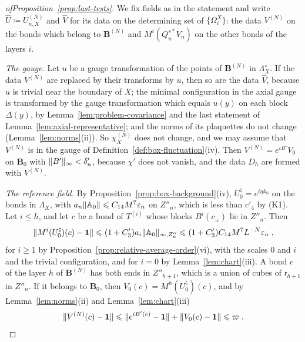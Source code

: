 \documentclass[11pt]{preprint}
\newcommand{\id}{\mathbf 1}
\DeclarePairedDelimiter{\norm}{\lVert}{\rVert}
\numberwithin{equation}{section}
\begin{document}
\begin{proof}[ofProposition~\ref{prop:last-tests}]
We fix fields as in the statement and write $\hat U \coloneqq U^{(N)}_{n,X}$ and $\hat V$ for its data on the determining set of $\{ \Omega^X_i \}$: the data $V^{(N)}$ on the bonds which belong to $\mathbf B^{(N)}$ and $M^i(Q^{s*}_nV_n)$ on the other bonds of the layers $i$.

\emph{The gauge.} Let $u$ be a gauge transformation of the points of $\mathbf B^{(N)}$ in $\Lambda^\circ_X$. If the data $V^{(N)}$ are replaced by their transforms by $u$, then so are the data $\hat V$, because $u$ is trivial near the boundary of $X$; the minimal configuration in the axial gauge is transformed by the gauge transformation which equals $u(y)$ on each block $\Delta(y)$, by Lemma~\ref{lem:problem-covariance} and the last statement of Lemma~\ref{lem:axial-representative}; and the norms of its plaquettes do not change (Lemma~\ref{lem:norms}(ii)). So $\chi^{(N)}_X$ does not change, and we may assume that $V^{(N)}$ is in the gauge of Definition~\ref{def:box-fluctuation}(iv). Then $V^{(N)} = e^{iB'}V_0$ on $\mathbf B_0$ with $\norm{B'}_\infty < \delta'_n$, because $\chi'$ does not vanish, and the data $D_h$ are formed with $V^{(N)}$.

\emph{The reference field.} By Proposition~\ref{prop:box-background}(iv), $U^\natural_0 = e^{i\eta\mathbb A_0}$ on the bonds in $\Lambda_X$, with $a_n\norm{\mathbb A_0} \leqslant C_{14}M^7\varepsilon_n$ on $Z''_n$, which is less than $c'_4$ by (K1). Let $i \leqslant h$, and let $c$ be a bond of $T^{(i)}$ whose blocks $B^i(c_\pm)$ lie in $Z''_n$. Then
\begin{equation}\label{eq:reference-averages}
    \norm{M^i(U^\natural_0)(c) - \id} \leqslant (1 + C'_3)a_i\norm{\mathbb A_0}_{\infty,Z''_n} \leqslant (1 + C'_3)C_{14}M^7L^{-N}\varepsilon_n\;,
\end{equation}
for $i \geqslant 1$ by Proposition~\ref{prop:relative-average-order}(vi), with the scales $0$ and $i$ and the trivial configuration, and for $i = 0$ by Lemma~\ref{lem:chart}(iii). A bond $c$ of the layer $h$ of $\mathbf B^{(N)}$ has both ends in $Z''_{h+1}$, which is a union of cubes of $\mathsf r_{h+1}$ in $Z''_n$. If it belongs to $\mathbf B_0$, then $V_0(c) = M^h(U^\natural_0)(c)$, and by Lemma~\ref{lem:norms}(ii) and Lemma~\ref{lem:chart}(iii)
\begin{equation}\label{eq:layer-h-field}
    \norm{V^{(N)}(c) - \id} \leqslant \norm{e^{iB'(c)} - \id} + \norm{V_0(c) - \id} \leqslant \varpi\;.
\end{equation}


\end{proof}
\end{document}

